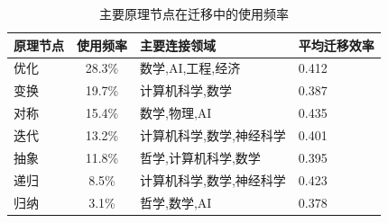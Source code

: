 \documentclass[12pt,a4paper]{article}
\begin{document}
\begin{table}[H]
\centering
\caption{主要原理节点在迁移中的使用频率}
\label{tab:principle_nodes_frequency}
\begin{tabular}{p{2.5cm}cp{3cm}p{2cm}}
\toprule
\textbf{原理节点} & \textbf{使用频率} & \textbf{主要连接领域} & \textbf{平均迁移效率} \\
\midrule
优化 & 28.3\% & 数学,AI,工程,经济 & 0.412 \\
变换 & 19.7\% & 计算机科学,数学 & 0.387 \\
对称 & 15.4\% & 数学,物理,AI & 0.435 \\
迭代 & 13.2\% & 计算机科学,数学,神经科学 & 0.401 \\
抽象 & 11.8\% & 哲学,计算机科学,数学 & 0.395 \\
递归 & 8.5\% & 计算机科学,数学,神经科学 & 0.423 \\
归纳 & 3.1\% & 哲学,数学,AI & 0.378 \\
\bottomrule
\end{tabular}
\end{table}
\end{document}
